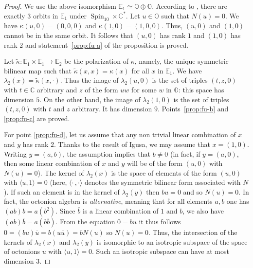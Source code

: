 \documentclass[JEP,XML,SOM,Unicode,NoFloatCountersInSection]{cedram}
\newcommand{\citestar}[3]{\cite[#3]{#1}}
\theoremstyle{plain}
\theoremstyle{definition}
\let\ov\overline
\DeclareMathOperator{\Spin}{Spin}
\newcommand{\bC}{\mathbb{C}}
\newcommand{\bE}{\mathbb{E}}
\newcommand{\bO}{\mathbb{O}}
\newcommand{\scal}[1]{\langle #1 \rangle}
\begin{document}
\begin{proof}
We use the above isomorphism $\bE_1 \simeq \bO \oplus \bO$. According to \citestar{igusa}*{Prop.\,2}, there are exactly
$3$ orbits in $\bE_1$ under $\Spin_{10} \times \bC^*$.
Let $u \in \bO$ such that $N(u)=0$. We have
$\kappa(u,0)=(0,0,0)$ and $\kappa(1,0)=(1,0,0)$. Thus, $(u,0)$ and $(1,0)$ cannot be in the same orbit.
It follows that $(u,0)$ has rank $1$ and $(1,0)$ has rank $2$ and statement~\eqref{prop:fu-a} of the proposition is
proved.

Let $\tilde \kappa: \bE_1 \times \bE_1 \to \bE_2$ be the polarization of $\kappa$, namely, the unique
symmetric bilinear map such that $\tilde \kappa (x, x) = \kappa (x)$ for all $x$ in $\bE_1$.
We have $\lambda_2(x)=\tilde \kappa (x, \cdot)$. Thus the image of $\lambda_2(u,0)$ is the set of triples
$(t,z,0)$ with $t \in \bC$ arbitrary and $z$ of the form $uw$ for some $w$ in $\bO$: this space
has dimension $5$. On the other hand, the image of $\lambda_2(1,0)$ is the set of triples
$(t,z,0)$ with $t$ and $z$ arbitrary. It has dimension $9$. Points~\eqref{prop:fu-b} and \eqref{prop:fu-c} are
proved.

For point \eqref{prop:fu-d}, let us assume that any non trivial linear combination of $x$ and $y$ has rank $2$. Thanks to the
result of Igusa, we may assume that $x=(1,0)$. Writing $y=(a,b)$, the assumption implies that $b \neq 0$
(in fact, if $y=(a,0)$, then some linear combination of $x$ and $y$ will be of the form $(u,0)$ with
$N(u)=0$). The kernel of $\lambda_2(x)$ is the space of elements of the form $(u,0)$ with $\scal{u,1}=0$
(here, $\scal{\cdot\,, \cdot}$ denotes the symmetric bilinear form associated with $N$).
If such an element is in the kernel of $\lambda_2(y)$ then $bu=0$ and so $N(u)=0$.
In fact, the octonion algebra is \emph{alternative}, meaning that for all elements $a,b$ one has
$(ab)b=a(b^2)$. Since $\ov b$ is a linear combination of $1$ and $b$, we also have
$(ab)\ov b=a(b \ov b)$.
From the equation $0=bu$ it thus follows $0=(bu)\ov u=b(u \ov u)=bN(u)$ so
$N(u)=0$.
Thus, the intersection of
the kernels of $\lambda_2(x)$ and $\lambda_2(y)$ is isomorphic to an isotropic subspace of the space of
octonions $u$ with $\scal{u,1}=0$.
Such an isotropic subspace can have at most dimension $3$.


\end{proof}
\end{document}
